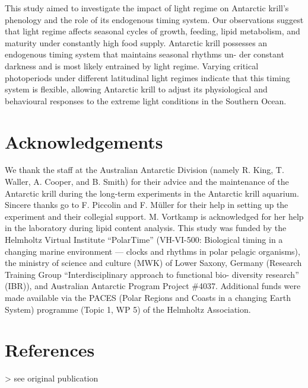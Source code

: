 This study aimed to investigate the impact of light regime on Antarctic krill’s
phenology and the role of its endogenous timing system. Our observations
suggest that light regime affects seasonal cycles of growth, feeding, lipid
metabolism, and maturity under constantly high food supply. Antarctic krill
possesses an endogenous timing system that maintains seasonal rhythms un- der
constant darkness and is most likely entrained by light regime. Varying
critical photoperiods under different latitudinal light regimes indicate that
this timing system is flexible, allowing Antarctic krill to adjust its
physiological and behavioural responses to the extreme light conditions in the
Southern Ocean. 

\section{Acknowledgements}

We thank the staff at the Australian Antarctic Division (namely R. King, T.
Waller, A. Cooper, and B. Smith) for their advice and the maintenance of the
Antarctic krill during the long-term experiments in the Antarctic krill
aquarium. Sincere thanks go to F. Piccolin and F. Müller for their help in
setting up the experiment and their collegial support. M. Vortkamp is
acknowledged for her help in the laboratory during lipid content analysis. This
study was funded by the Helmholtz Virtual Institute “PolarTime” (VH-VI-500:
Biological timing in a changing marine environment — clocks and rhythms in
polar pelagic organisms), the ministry of science and culture (MWK) of Lower
Saxony, Germany (Research Training Group “Interdisciplinary approach to
functional bio- diversity research” (IBR)), and Australian Antarctic Program
Project \#4037. Additional funds were made available via the PACES (Polar
Regions and Coasts in a changing Earth System) programme (Topic 1, WP 5) of the
Helmholtz Association. 


\section{References}
> see original publication
